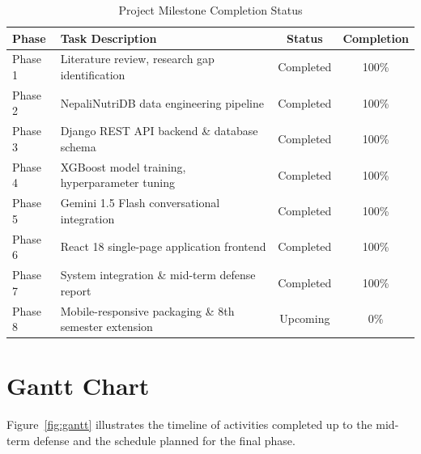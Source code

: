\documentclass[12pt,a4paper]{report}
\begin{document}
\begin{table}[htbp]
\centering
\caption{Project Milestone Completion Status}
\label{tab:milestones}
\begin{tabular}{llcc}
\toprule
\textbf{Phase} & \textbf{Task Description} & \textbf{Status} & \textbf{Completion} \\
\midrule
Phase 1 & Literature review, research gap identification & Completed & 100\% \\
Phase 2 & NepaliNutriDB data engineering pipeline & Completed & 100\% \\
Phase 3 & Django REST API backend \& database schema & Completed & 100\% \\
Phase 4 & XGBoost model training, hyperparameter tuning & Completed & 100\% \\
Phase 5 & Gemini 1.5 Flash conversational integration & Completed & 100\% \\
Phase 6 & React 18 single-page application frontend & Completed & 100\% \\
Phase 7 & System integration \& mid-term defense report & Completed & 100\% \\
Phase 8 & Mobile-responsive packaging \& 8th semester extension & Upcoming & 0\% \\
\bottomrule
\end{tabular}
\end{table}

\section{Gantt Chart}

Figure~\ref{fig:gantt} illustrates the timeline of activities completed up to the mid-term defense and the schedule planned for the final phase.
\end{document}
